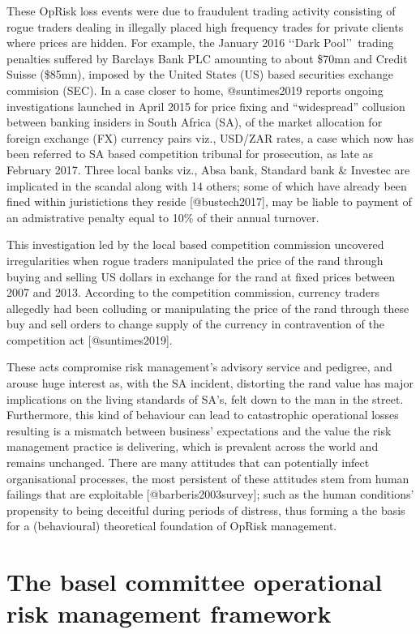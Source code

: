 \documentclass[]{article}
\begin{document}
These OpRisk loss events were due to fraudulent trading activity
consisting of rogue traders dealing in illegally placed high frequency
trades for private clients where prices are hidden. For example, the
January 2016 \lq\lq Dark Pool\rq\rq~trading penalties suffered by
Barclays Bank PLC amounting to about \$70mn and Credit Suisse (\$85mn),
imposed by the United States (US) based securities exchange commision
(SEC). In a case closer to home, @suntimes2019 reports ongoing
investigations launched in April 2015 for price fixing and
``widespread'' collusion between banking insiders in South Africa (SA),
of the market allocation for foreign exchange (FX) currency pairs viz.,
USD/ZAR rates, a case which now has been referred to SA based
competition tribunal for prosecution, as late as February 2017. Three
local banks viz., Absa bank, Standard bank \& Investec are implicated in
the scandal along with 14 others; some of which have already been fined
within juristictions they reside {[}@bustech2017{]}, may be liable to
payment of an admistrative penalty equal to 10\% of their annual
turnover.\medskip

This investigation led by the local based competition commission
uncovered irregularities when rogue traders manipulated the price of the
rand through buying and selling US dollars in exchange for the rand at
fixed prices between 2007 and 2013. According to the competition
commission, currency traders allegedly had been colluding or
manipulating the price of the rand through these buy and sell orders to
change supply of the currency in contravention of the competition act
{[}@suntimes2019{]}.\medskip

These acts compromise risk management's advisory service and pedigree,
and arouse huge interest as, with the SA incident, distorting the rand
value has major implications on the living standards of SA's, felt down
to the man in the street. Furthermore, this kind of behaviour can lead
to catastrophic operational losses resulting is a mismatch between
business' expectations and the value the risk management practice is
delivering, which is prevalent across the world and remains unchanged.
There are many attitudes that can potentially infect organisational
processes, the most persistent of these attitudes stem from human
failings that are exploitable {[}@barberis2003survey{]}; such as the
human conditions' propensity to being deceitful during periods of
distress, thus forming a the basis for a (behavioural) theoretical
foundation of OpRisk management.

\section{The basel committee operational risk management framework}
\label{sec:The basel committee operational risk management framework}
\end{document}

